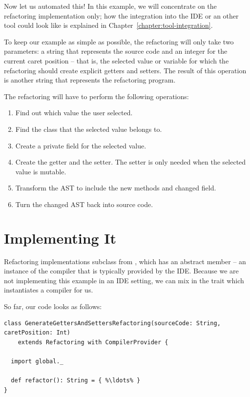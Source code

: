 \documentclass[10pt,a4paper,oneside]{scrreprt}
\begin{document}
Now let us automated this! In this example, we will concentrate on the refactoring implementation only; how the integration into the IDE or an other tool could look like is explained in Chapter~\vref{chapter:tool-integration}.

To keep our example as simple as possible, the refactoring will only take two parameters: a string that represents the source code and an integer for the current caret position -- that is, the selected value or variable for which the refactoring should create explicit getters and setters. The result of this operation is another string that represents the refactoring program. 

The refactoring will have to perform the following operations:

\begin{enumerate}
  \item Find out which value the user selected.
  \item Find the class that the selected value belongs to.
  \item Create a private field for the selected value.
  \item Create the getter and the setter. The setter is only needed when the selected value is mutable.
  \item Transform the AST to include the new methods and changed field.
  \item Turn the changed AST back into source code.
\end{enumerate}

\section{Implementing It}

Refactoring implementations subclass from , which has an abstract member  -- an instance of the compiler that is typically provided by the IDE. Because we are not implementing this example in an IDE setting, we can mix in the  trait which instantiates a compiler for us.

So far, our code looks as follows:

\begin{lstlisting}
class GenerateGettersAndSettersRefactoring(sourceCode: String, caretPosition: Int) 
    extends Refactoring with CompilerProvider {
  
  import global._
  
  def refactor(): String = { %\ldots% }
}
\end{lstlisting}
\end{document}
